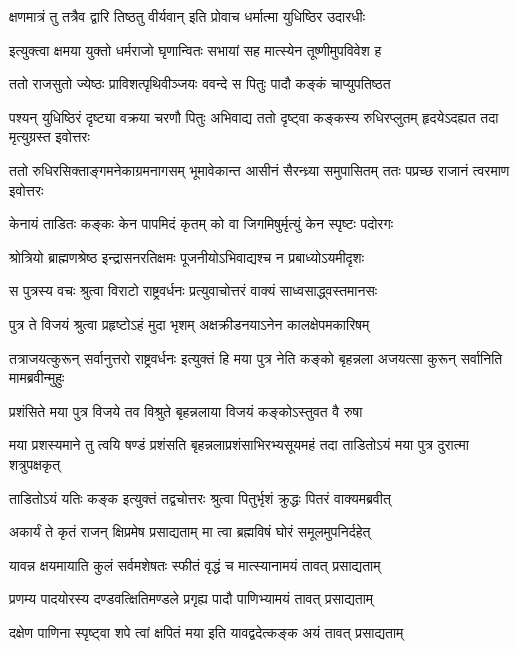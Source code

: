 \twolineshloka
{क्षणमात्रं तु तत्रैव द्वारि तिष्ठतु वीर्यवान्}
{इति प्रोवाच धर्मात्मा युधिष्ठिर उदारधीः}


\twolineshloka
{इत्युक्त्वा क्षमया युक्तो धर्मराजो घृणान्वितः}
{सभायां सह मात्स्येन तूष्णीमुपविवेश ह}


\twolineshloka
{ततो राजसुतो ज्येष्ठः प्राविशत्पृथिवीञ्जयः}
{ववन्दे स पितुः पादौ कङ्कं चाप्युपतिष्ठत}


\threelineshloka
{पश्यन् युधिष्ठिरं दृष्ट्या वक्रया चरणौ पितुः}
{अभिवाद्य ततो दृष्ट्वा कङ्कस्य रुधिरप्लुतम्}
{हृदयेऽदह्यत तदा मृत्युग्रस्त इवोत्तरः}


\threelineshloka
{ततो रुधिरसिक्ताङ्गमनेकाग्रमनागसम्}
{भूमावेकान्त आसीनं सैरन्ध्र्या समुपासितम्}
{ततः पप्रच्छ राजानं त्वरमाण इवोत्तरः}


\twolineshloka
{केनायं ताडितः कङ्कः केन पापमिदं कृतम्}
{को वा जिगमिषुर्मृत्युं केन स्पृष्टः पदोरगः}


\twolineshloka
{श्रोत्रियो ब्राह्मणश्रेष्ठ इन्द्रासनरतिक्षमः}
{पूजनीयोऽभिवाद्यश्च न प्रबाध्योऽयमीदृशः}



\twolineshloka
{स पुत्रस्य वचः श्रुत्वा विराटो राष्ट्रवर्धनः}
{प्रत्युवाचोत्तरं वाक्यं साध्वसाद्ध्वस्तमानसः}


\twolineshloka
{पुत्र ते विजयं श्रुत्वा प्रहृष्टोऽहं मुदा भृशम्}
{अक्षक्रीडनयाऽनेन कालक्षेपमकारिषम्}


\threelineshloka
{तत्राजयत्कुरून् सर्वानुत्तरो राष्ट्रवर्धनः}
{इत्युक्तं हि मया पुत्र नेति कङ्को बृहन्नला}
{अजयत्सा कुरून् सर्वानिति मामब्रवीन्मुहुः}


\twolineshloka
{प्रशंसिते मया पुत्र विजये तव विश्रुते}
{बृहन्नलाया विजयं कङ्कोऽस्तुवत वै रुषा}


\threelineshloka
{मया प्रशस्यमाने तु त्वयि षण्डं प्रशंसति}
{बृहन्नलाप्रशंसाभिरभ्यसूयमहं तदा}
{ताडितोऽयं मया पुत्र दुरात्मा शत्रुपक्षकृत्}


\twolineshloka
{ताडितोऽयं यतिः कङ्क इत्युक्तं तद्वचोत्तरः}
{श्रुत्वा पितुर्भृशं क्रुद्धः पितरं वाक्यमब्रवीत्}


\twolineshloka
{अकार्यं ते कृतं राजन् क्षिप्रमेष प्रसाद्यताम्}
{मा त्वा ब्रह्मविषं घोरं समूलमुपनिर्दहेत्}


\twolineshloka
{यावन्न क्षयमायाति कुलं सर्वमशेषतः}
{स्फीतं वृद्धं च मात्स्यानामयं तावत् प्रसाद्यताम्}


\twolineshloka
{प्रणम्य पादयोरस्य दण्डवत्क्षितिमण्डले}
{प्रगृह्य पादौ पाणिभ्यामयं तावत् प्रसाद्यताम्}


\twolineshloka
{दक्षेण पाणिना स्पृष्ट्वा शपे त्वां क्षपितं मया}
{इति यावद्वदेत्कङ्क अयं तावत् प्रसाद्यताम्}


